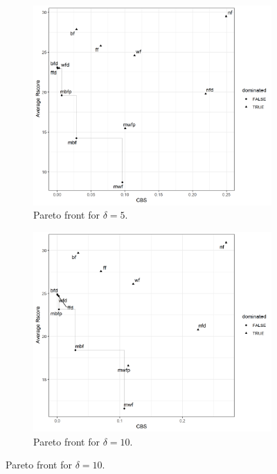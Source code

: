 \begin{figure}[H] 
    \centering
    \begin{subfigure}{0.3\textwidth}
        \includegraphics[width=\textwidth]{images/controller/pareto_front/5.png}
        \caption{Pareto front for $\delta = 5$.}
    \end{subfigure}
    \begin{subfigure}{0.3\textwidth}
        \includegraphics[width=\textwidth]{images/controller/pareto_front/10.png}
        \caption{Pareto front for $\delta = 10$.}

\end{subfigure}
\end{figure}
